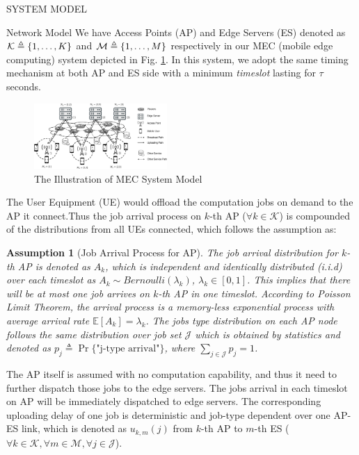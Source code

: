 \documentclass[10pt, conference, letterpaper]{IEEEtran}
\newtheorem{assumption}{Assumption}
\newcommand{\define}{\triangleq}
\DeclarePairedDelimiter{\set}{\{}{\}}
\newcommand{\apSet}{\mathcal{K}}
\newcommand{\esSet}{\mathcal{M}}
\newcommand{\jSpace}{\mathcal{J}}
\begin{document}
    \begin{section}{SYSTEM MODEL}
        \label{sec:model}
        \begin{subsection}{Network Model}
            We have Access Points (AP) and Edge Servers (ES) denoted as $\apSet \define \set{1,\dots,K}$ and $\mathcal{M} \define \set{1,\dots,M}$ respectively in our MEC (mobile edge computing) system depicted in Fig. \ref{fig:system}. In this system, we adopt the same timing mechanism at both AP and ES side with a minimum \emph{timeslot} lasting for $\tau$ seconds.

            \begin{figure}[ht]
                \centering
                \includegraphics[width=0.45\textwidth, trim={0.5cm 0.5cm 0.5cm 0.5cm}, clip]{system-model.pdf}
                \caption{The Illustration of MEC System Model}
                \label{fig:system}
            \end{figure}

            The User Equipment (UE) would offload the computation jobs on demand to the AP it connect.Thus the job arrival process on $k$-th AP ($\forall k\in\apSet$) is compounded of the distributions from all UEs connected, which follows the assumption as:
            \begin{assumption}[Job Arrival Process for AP]
                The job arrival distribution for $k$-th AP is denoted as $A_k$, which is independent and identically distributed (i.i.d) over each timeslot as $A_k \sim Bernoulli(\lambda_k)$, $\lambda_k\in[0,1]$. This implies that there will be at most one job arrives on $k$-th AP in one timeslot. According to \emph{Poisson Limit Theorem}, the arrival process is a memory-less exponential process with average arrival rate $\mathbb{E}[A_k]=\lambda_k$.
                The jobs type distribution on each AP node follows the same distribution over job set $\jSpace$ which is obtained by statistics and denoted as $p_j \define \Pr\{\text{"j-type arrival"}\}$, where $\sum_{j\in\jSpace} p_j=1$.
            \end{assumption}

            The AP itself is assumed with no computation capability, and thus it need to further dispatch those jobs to the edge servers.
            The jobs arrival in each timeslot on AP will be immediately dispatched to edge servers.
            The corresponding uploading delay of one job is {\color{red}deterministic and job-type dependent over one AP-ES link}, which is denoted as $u_{k,m}(j)$ from $k$-th AP to $m$-th ES ($\forall k\in\apSet, \forall m\in\esSet, \forall j\in\jSpace$).


\end{subsection}
\end{section}
\end{document}
